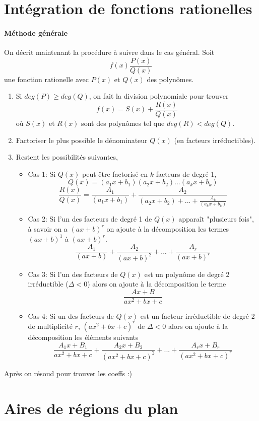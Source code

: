 \documentclass[10pt,a4paper]{book}
\begin{document}
\section{Intégration de fonctions rationelles}

\paragraph{Méthode générale} On décrit maintenant la procédure à suivre dans le cas général. Soit
\[f(x) \frac{P(x)}{Q(x)}\]
une fonction rationelle avec $P(x)$ et $Q(x)$ des polynômes.

\begin{enumerate}
\item Si $deg(P) \geq deg(Q)$, on fait la division polynomiale pour trouver
\[f(x) = S(x) + \frac{R(x)}{Q(x)}\]
où $S(x)$ et $R(x)$ sont des polynômes tel que $deg(R) < deg(Q)$.
\item Factoriser le plus possible le dénominateur $Q(x)$ (en facteurs irréductibles).

\item Restent les possibilités suivantes,
\begin{itemize}
\item Cas 1: Si $Q(x)$ peut être factorisé en $k$ facteurs de degré 1,
\[Q(x)= (a_1x + b_1)(a_2x + b_2)...(a_kx + b_k)\]
\[\frac{R(x)}{Q(x)} = \frac{A_1}{(a_1x + b_1)}+ \frac{A_2}{(a_2x + b_2) + ... + \frac{A_k}{(a_kx + b_k)}}\]
\item Cas 2: Si l'un des facteurs de degré 1 de $Q(x)$ apparaît "plusieurs fois", à savoir on a $(ax+b)^r$ on ajoute à la décomposition les termes $(ax + b)^1$ à $(ax+b)^r$.
\[\frac{A_1}{(ax+b)} + \frac{A_2}{(ax+b)^2} + ... + \frac{A_r}{(ax+b)^r}\]
\item Cas 3: Si l'un des facteurs de $Q(x)$ est un polynôme de degré 2 irréductible ($\Delta < 0$) alors on ajoute à la décomposition le terme
\[\frac{Ax+B}{ax^2+bx+c}\]
\item Cas 4: Si un des facteurs de $Q(x)$ est un facteur irréductible de degré 2 de multiplicité $r$, $(ax^2+bx+c)^r$ de $\Delta < 0$ alors on ajoute à la décomposition les éléments suivants
\[\frac{A_1x+B_1}{ax^2+bx+c}+ \frac{A_2x+B_2}{(ax^2+bx+c)^2} + ... + \frac{A_rx+B_r}{(ax^2+bx+c)^r}\]
\end{itemize}
\end{enumerate}
Après on résoud pour trouver les coeffs :) %

\section{Aires de régions du plan}
 
\end{document}
